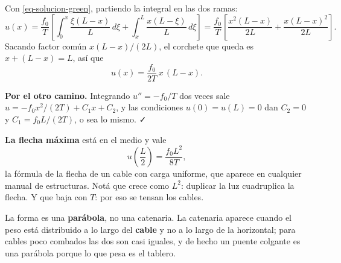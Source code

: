 \documentclass[
  spanish,
  a4paper,
]{scrbook}
\theoremstyle{definition}
\theoremstyle{plain}
\theoremstyle{definition}
\theoremstyle{plain}
\theoremstyle{definition}
\theoremstyle{remark}
\begin{document}
\begin{tcolorbox}[enhanced jigsaw, arc=.35mm, bottomrule=.15mm, bottomtitle=1mm, breakable, colback=white, colbacktitle=quarto-callout-tip-color!10!white, colframe=quarto-callout-tip-color-frame, coltitle=black, left=2mm, leftrule=.75mm, opacityback=0, opacitybacktitle=0.6, rightrule=.15mm, title=\textcolor{quarto-callout-tip-color}{\faLightbulb}\hspace{0.5em}{Solución}, titlerule=0mm, toprule=.15mm, toptitle=1mm]

Con \ref{eq-solucion-green}, partiendo la integral en las dos ramas: \[
u(x) = \frac{f_0}{T}\left[\int_0^{x}\frac{\xi(L-x)}{L}\,d\xi + \int_x^{L}\frac{x(L-\xi)}{L}\,d\xi\right]
= \frac{f_0}{T}\left[\frac{x^2(L-x)}{2L} + \frac{x(L-x)^2}{2L}\right] .
\] Sacando factor común \(x(L-x)/(2L)\), el corchete que queda es
\(x + (L-x) = L\), así que \[
\boxed{\;u(x) = \frac{f_0}{2T}\,x\,(L-x).\;}
\]

\textbf{Por el otro camino.} Integrando \(u'' = -f_0/T\) dos veces sale
\(u = -f_0x^2/(2T) + C_1x + C_2\), y las condiciones \(u(0)=u(L)=0\) dan
\(C_2=0\) y \(C_1 = f_0L/(2T)\), o sea lo mismo. ✓

\textbf{La flecha máxima} está en el medio y vale
\[u\left(\frac{L}{2}\right) = \frac{f_0L^2}{8T},\] la fórmula de la
flecha de un cable con carga uniforme, que aparece en cualquier manual
de estructuras. Notá que crece como \(L^2\): duplicar la luz cuadruplica
la flecha. Y que baja con \(T\): por eso se tensan los cables.

La forma es una \textbf{parábola}, no una catenaria. La catenaria
aparece cuando el peso está distribuido a lo largo del \textbf{cable} y
no a lo largo de la horizontal; para cables poco combados las dos son
casi iguales, y de hecho un puente colgante es una parábola porque lo
que pesa es el tablero.

\end{tcolorbox}
\end{document}
